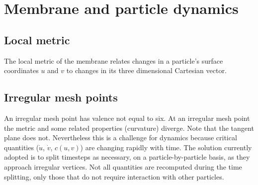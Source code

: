 
\section{ Membrane and particle dynamics } \label{sec:dynamics}

\subsection{Local metric}

The local metric of the membrane relates changes in a particle's surface coordinates $u$ and $v$ to changes in its three dimensional Cartesian vector. 

\subsection{Irregular mesh points}

An irregular mesh point has valence not equal to six.
At an irregular mesh point the metric and some related properties (curvature) diverge.
Note that the tangent plane does not.
Nevertheless this is a challenge for dynamics because critical quantities ($\dot{u}$, $\dot{v}$, $c(u,v)$) are changing rapidly with time.
The solution currently adopted is to split timesteps as necessary, on a particle-by-particle basis, as they approach irregular vertices.
Not all quantities are recomputed during the time splitting, only those that do not require interaction with other particles. 
